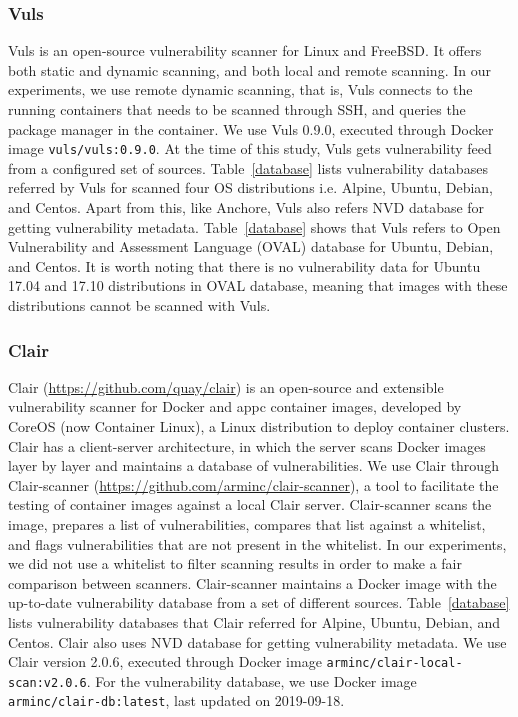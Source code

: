 \documentclass[a4paper,num-refs]{oup-contemporary}
\begin{document}
\subsubsection{Vuls}

Vuls is an open-source vulnerability scanner for Linux and FreeBSD. It
offers both static and dynamic scanning, and both local and remote
scanning. In our experiments, we use remote dynamic scanning, that is, Vuls
connects to the running containers that needs to be scanned through SSH, and queries the package manager
in the container. We use Vuls 0.9.0, executed through Docker image
\texttt{vuls/vuls:0.9.0}. At the time of this study, Vuls gets vulnerability feed
from a configured set of sources. Table~\ref{database} lists vulnerability databases
referred by Vuls for scanned four OS distributions i.e. Alpine, Ubuntu, Debian, and Centos.
Apart from this, like Anchore, Vuls also refers NVD database for getting vulnerability metadata.
Table~\ref{database} shows that Vuls
refers to Open Vulnerability and Assessment Language (OVAL) database for Ubuntu, Debian, and Centos.
It is worth noting that there is
no vulnerability data for Ubuntu 17.04 and 17.10 distributions in OVAL database, meaning that images
with these distributions cannot be scanned with Vuls.

\subsubsection{Clair}

Clair (\url{https://github.com/quay/clair}) is an open-source and extensible
vulnerability scanner for Docker and appc container images, developed by
CoreOS (now Container Linux), a Linux distribution to deploy container
clusters. Clair has a client-server architecture, in which the server
scans Docker images layer by layer and maintains a database of vulnerabilities. We use Clair through Clair-scanner
(\url{https://github.com/arminc/clair-scanner}), a tool to facilitate the testing
of container images against a local Clair server. Clair-scanner scans the image,
prepares a list of vulnerabilities, compares that list against a
whitelist, and flags vulnerabilities that are not present in the whitelist.
In our experiments, we did not use a whitelist to filter scanning results in
order to make a fair comparison between scanners.
Clair-scanner maintains a Docker image with the up-to-date vulnerability
database from a set of different sources. Table~\ref{database} lists
vulnerability databases that Clair referred for Alpine, Ubuntu, Debian, and Centos.
Clair also uses NVD database for getting vulnerability metadata.
We use Clair version 2.0.6, executed through
Docker image \texttt{arminc/clair-local-scan:v2.0.6}. For the vulnerability
database, we use Docker image \texttt{arminc/clair-db:latest}, last
updated on 2019-09-18.
\end{document}
